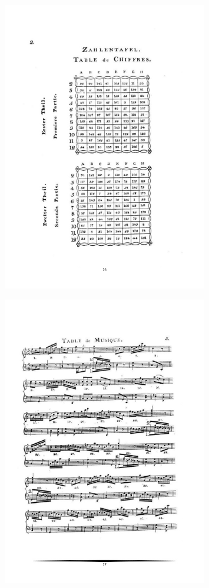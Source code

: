 \documentclass[a4paper, openright, 11pt, titlepage]{report}
\theoremstyle{definition}\newtheorem{defin}[propo]{Definition}
\theoremstyle{definition}\newtheorem{obser}[propo]{Remark}
\theoremstyle{definition}\newtheorem{ejem}[propo]{Ejemplo}
\theoremstyle{definition}\newtheorem{algoritmo}[propo]{Algoritmo}
\begin{document}
\begin{figure}[H]
    \centering
    \includegraphics[width = 0.8\textwidth]{mozart3.png}
\end{figure}
\begin{figure}[H]
    \centering
    \includegraphics[width = 0.8\textwidth]{mozart4.png}
\end{figure}
\end{document}
